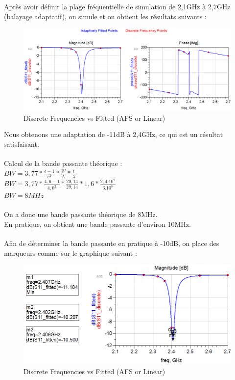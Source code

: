 \documentclass[16pt,a4paper,oneside,titlepage]{report}
\begin{document}
Après avoir définit la plage fréquentielle de simulation de 2,1GHz à 2,7GHz (balayage adaptatif), on simule et on obtient les résultats suivants :
\begin{figure}[h]
\center
\includegraphics[scale=0.4]{Images/P3_Q6-1.png}
\caption{Discrete Frequencies vs Fitted (AFS or Linear)}
\end{figure}

Nous obtenons une adaptation de -11dB à 2,4GHz, ce qui est un résultat satisfaisant.\\\\
Calcul de la bande passante théorique :\\
$BW = 3,77*\frac{\epsilon -1}{\epsilon^2}*\frac{W}{L}*\frac{t}{\lambda}$\\\indent
$BW = 3,77*\frac{4,6 -1}{4,6^2}*\frac{29,14}{29,14}*1,6*\frac{2,4.10^9}{3.10^8}$\\\indent
$BW = 8MHz$\\\\
On a donc une bande passante théorique de 8MHz. \\
En pratique, on obtient une bande passante d'environ 10MHz.\\\\
Afin de déterminer la bande passante en pratique à -10dB, on place des marqueurs comme sur le graphique suivant :
\begin{figure}[h]
\center
\includegraphics[scale=0.4]{Images/P3_Q7.png}
\caption{Discrete Frequencies vs Fitted (AFS or Linear)}
\end{figure}
\end{document}

